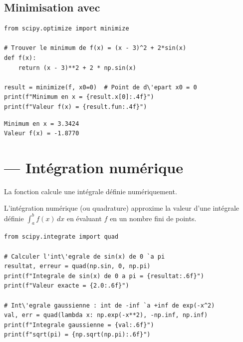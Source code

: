 \subsection{Minimisation avec }

\begin{codeblock}[title=\textbf{Python}]
\begin{verbatim}
from scipy.optimize import minimize

# Trouver le minimum de f(x) = (x - 3)^2 + 2*sin(x)
def f(x):
    return (x - 3)**2 + 2 * np.sin(x)

result = minimize(f, x0=0)  # Point de d\'epart x0 = 0
print(f"Minimum en x = {result.x[0]:.4f}")
print(f"Valeur f(x) = {result.fun:.4f}")
\end{verbatim}
\end{codeblock}

\begin{codeoutput}
\begin{verbatim}
Minimum en x = 3.3424
Valeur f(x) = -1.8770
\end{verbatim}
\end{codeoutput}

\section{ --- Int\'egration num\'erique}

La fonction  calcule une int\'egrale d\'efinie num\'eriquement.

\begin{definition}
L'int\'egration num\'erique (ou quadrature) approxime la valeur d'une int\'egrale
d\'efinie $\int_a^b f(x)\,dx$ en \'evaluant $f$ en un nombre fini de points.
\end{definition}

\begin{codeblock}[title=\textbf{Python}]
\begin{verbatim}
from scipy.integrate import quad

# Calculer l'int\'egrale de sin(x) de 0 `a pi
resultat, erreur = quad(np.sin, 0, np.pi)
print(f"Integrale de sin(x) de 0 a pi = {resultat:.6f}")
print(f"Valeur exacte = {2.0:.6f}")

# Int\'egrale gaussienne : int de -inf `a +inf de exp(-x^2)
val, err = quad(lambda x: np.exp(-x**2), -np.inf, np.inf)
print(f"Integrale gaussienne = {val:.6f}")
print(f"sqrt(pi) = {np.sqrt(np.pi):.6f}")
\end{verbatim}
\end{codeblock}

